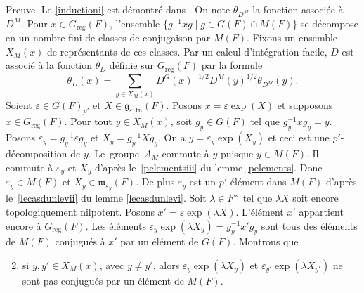 \documentclass[JEP,XML,SOM,Unicode,francais]{cedram}
\let\epsilon\varepsilon
\let\sep\mid
\newcommand{\frg}{\mathfrak{g}}
\newcommand{\mfrm}{\mathfrak{m}}
\newcommand{\reg}{\mathrm{reg}}
\newcommand{\tn}{\mathrm{tn}}
\theoremstyle{plain}
\theoremstyle{definition}
\begin{document}
Preuve. Le \eqref{inductioni} est démontré dans \cite[Lem.\,2.3]{W3}. On note $\theta_{D^M}$ la fonction associée à~$D^M$. Pour $x\in G_{\reg}(F)$, l'ensemble $\{g^{-1}xg\sep g\in G(F)\cap M(F)\}$ se décompose en un nombre fini de classes de conjugaison par $M(F)$. Fixons un ensemble $X_{M}(x)$ de représentants de ces classes. Par un calcul d'intégration facile, $D$ est associé à la fonction $\theta_{D}$ définie sur $G_{\reg}(F)$ par la formule\vspace*{-2pt}\enlargethispage{.5\baselineskip}%
\begin{equation}\tag{1}\label{induction1}
\theta_{D}(x)=\sum_{y\in X_{M}(x)}D^G(x)^{-1/2}D^M(y)^{1/2}\theta_{D^M}(y).
\end{equation}
Soient $\epsilon\in G(F)_{p'}$ et $X\in \frg_{\epsilon,\tn}(F)$. Posons $x=\epsilon \exp(X)$ et supposons $x\in G_{\reg}(F)$. Pour tout $y\in X_{M}(x)$, soit $g_{y}\in G(F)$ tel que $g_{y}^{-1}xg_{y}=y$. Posons $\epsilon_{y}=g_{y}^{-1}\epsilon g_{y}$ et $X_{y}=g_{y}^{-1}X g_{y}$. On a $y=\epsilon_{y}\exp(X_{y})$ et ceci est une $p'$-décomposition de $y$. Le~grou\-pe~$A_{M}$ commute à $y$ puisque $y\in M(F)$. Il commute à $\epsilon_{y}$ et $X_{y}$ d'après le~\eqref{pelementsiii} du lemme \ref{pelements}. Donc $\epsilon_{y}\in M(F)$ et $X_{y}\in \mfrm_{\epsilon_{y}}(F)$. De plus $\epsilon_{y}$ est un $p'$-élément dans $M(F)$ d'après le~\eqref{lecasdunlevii} du lemme \ref{lecasdunlevi}. Soit $\lambda\in F^{\times}$ tel que $\lambda X$ soit encore topologiquement nilpotent. Posons $x'=\epsilon \exp(\lambda X)$. L'élément $x'$ appartient encore à $G_{\reg}(F)$. Les éléments $\epsilon_{y}\exp(\lambda X_{y})=g_{y}^{-1}x'g_{y}$ sont tous des éléments de $M(F)$ conjugués à $x'$ par un élément de $G(F)$. Montrons que
\begin{enumerate}\setcounter{enumi}{1}
\item\label{induction2}
si $y,y'\in X_{M}(x)$, avec $y\neq y'$, alors $\epsilon_{y}\exp(\lambda X_{y})$ et $\epsilon_{y'}\exp(\lambda X_{y'})$ ne sont pas conjugués par un élément de $M(F)$.
\end{enumerate}
\end{document}
